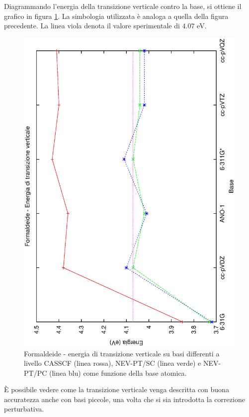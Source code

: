 Diagrammando l'energia della transizione verticale contro la base, si ottiene
il grafico in figura \ref{fig:formaldeide_energie_vert}. La simbologia
utilizzata \`e analoga a quella della figura precedente. La linea viola denota
il valore sperimentale di $4.07$ eV.

\begin{figure}[ht]
\begin{center}
\includegraphics[angle=270,width=12cm,keepaspectratio]{immagini/formaldeide/energie_vert.eps}
\parbox[h]{12cm}{
\caption{\small Formaldeide - energia di transizione verticale su basi differenti a livello CASSCF (linea rossa), NEV-PT/SC (linea verde) e NEV-PT/PC (linea blu) come funzione della base atomica.}
\label{fig:formaldeide_energie_vert}
}
\end{center}
\end{figure}

\`E possibile vedere come la transizione verticale venga descritta con buona accuratezza
anche con basi piccole, una volta che si sia introdotta la correzione perturbativa.
\clearpage

